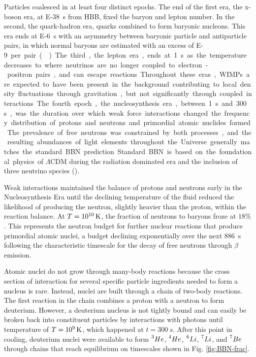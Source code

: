 \documentclass{paper}
\begin{document}
  Particles coalesced in at least four distinct epochs. The end of the first 
  era, the x-boson era, at \SI{E-38}{s} from HBB, fixed the baryon and lepton 
  number.  In the second, the quark-hadron era, quarks combined to form 
  baryonic nucleons. This era ends at \SI{E-6}{s} with an asymmetry between 
  baryonic particle and antiparticle pairs, in which normal baryons are 
  estimated with an excess of \SI{E-9} per pair (\cite{1993PhRvL..70.2833F}). 
  The third, the lepton era, ends at \SI{1}{s} as the temperature decreases to 
  where neutrinos are no longer coupled to electron-positron pairs, and can 
  escape reactions. Throughout these eras, WIMPs are expected to have been 
  present in the background contributing to local density fluctuations 
  through gravitation, but not significantly through coupled interactions.

  The fourth epoch, the nucleosynthesis era, between \SI{1}{s} and 
  \SI{300}{s}, was the duration over which weak force interactions changed
  the frequency distribution of protons and neutrons and primordial atomic 
  nuclides formed. The prevalence of free neutrons was constrained by both
  processes, and the resulting abundances of light elements throughout the 
  Universe generally matches the standard BBN prediction. Standard BBN is 
  based on the foundational physics of $\Lambda$CDM during the radiation 
  dominated era and the inclusion of three neutrino species 
  (\cite{Cyburt_2016}). 

  Weak interactions maintained the balance of protons and neutrons early in
  the Nucleosynthesis Era until the declining temperature of the fluid reduced 
  the likelihood of producing the neutron, slightly heavier than the proton, 
  within the reaction balance. At \(T = \SI{E10}{K}\), the fraction of 
  neutrons to baryons froze at \(18\%\). This represents the neutron budget 
  for further nuclear reactions that produce primordial atomic nuclei, a 
  budget declining exponentially over the next \SI{886}{s} following the 
  characteristic timescale for the decay of free neutrons through \(\beta\)
  emission.

  Atomic nuclei do not grow through many-body reactions because the cross 
  section of interaction for several specific particle ingredients needed to 
  form a nucleus is rare. Instead, nuclei are built through a chain of 
  two-body reactions. The first reaction in the chain combines a proton with a 
  neutron to form deuterium. However, a deuterium nucleus is not tightly bound 
  and can easily be broken back into constituent particles by interactions 
  with photons until temperature of \(T = \SI{E9}{K}\), which happened at 
  \(t = \SI{300}{s}\). After this point in cooling, deuterium nuclei were 
  available to form \(\prescript{3}{}{He}\), \(\prescript{4}{}{He}\), 
  \(\prescript{6}{}{Li}\), \(\prescript{7}{}{Li}\), and 
  \(\prescript{7}{}{Be}\) through chains that reach equilibrium on timescales 
  shown in Fig. \ref{fig:BBN-frac}.
\end{document}
